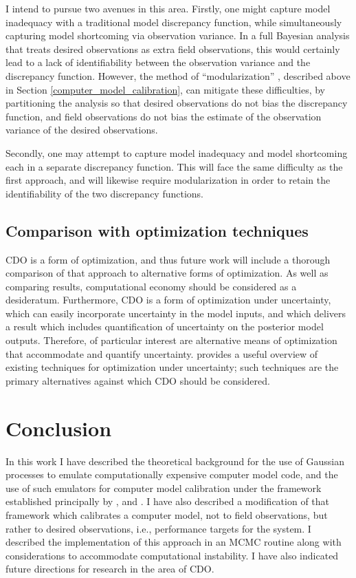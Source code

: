 \documentclass{article}
\begin{document}
I intend to pursue two avenues in this area. Firstly, one might capture model inadequacy with a traditional model discrepancy function, while simultaneously capturing model shortcoming via observation variance. In a full Bayesian analysis that treats desired observations as extra field observations, this would certainly lead to a lack of identifiability between the observation variance and the discrepancy function. However, the method of ``modularization'' \citep{Liu2009,Bayarri2007,Bayarri}, described above in Section \ref{computer_model_calibration}, can mitigate these difficulties, by partitioning the analysis so that desired observations do not bias the discrepancy function, and field observations do not bias the estimate of the observation variance of the desired observations.

Secondly, one may attempt to capture model inadequacy and model shortcoming each in a separate discrepancy function. This will face the same difficulty as the first approach, and will likewise require modularization in order to retain the identifiability of the two discrepancy functions.

\subsection{Comparison with optimization techniques}

CDO is a form of optimization, and thus future work will include a thorough comparison of that approach to alternative forms of optimization. As well as comparing results, computational economy should be considered as a desideratum. Furthermore, CDO is a form of optimization under uncertainty, which can easily incorporate uncertainty in the model inputs, and which delivers a result which includes quantification of uncertainty on the posterior model outputs. Therefore, of particular interest are alternative means of optimization that accommodate and quantify uncertainty. \cite{Sahinidis2004} provides a useful overview of existing techniques for optimization under uncertainty; such techniques are the primary alternatives against which CDO should be considered.

\section{Conclusion}

In this work I have described the theoretical background for the use of Gaussian processes to emulate computationally expensive computer model code, and the use of such emulators for computer model calibration under the framework established principally by \cite{Kennedy2001}, \cite{Williams2006} and \cite{Bayarri2007}. I have also described a modification of that framework which calibrates a computer model, not to field observations, but rather to desired observations, i.e., performance targets for the system. I described the implementation of this approach in an MCMC routine along with considerations to accommodate computational instability. I have also indicated future directions for research in the area of CDO.
\end{document}
